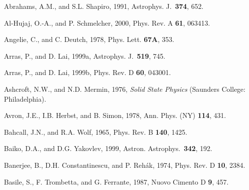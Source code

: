 


\begin{references}

\def\apj{{Astrophys. J.~}}
\def\aa{{Astron. Astrophys.~}}
\def\mnras{{Mon. Not. R. Astron. Soc.~}}
\def\pra{{Phys. Rev. A~}}
\def\prd{{Phys. Rev. D~}}
\def\prl{{Phys. Rev. Lett.~}}


\harvarditem{}{}{}
Abrahams, A.M., and S.L. Shapiro, 1991, \apj {\bf 374}, 652.


\harvarditem{}{}{}
Al-Hujaj, O.-A., and P. Schmelcher, 2000, Phys. Rev. A {\bf 61}, 063413.

\harvarditem{}{}{}
Angelie, C., and C. Deutch, 1978, Phys. Lett. {\bf 67A}, 353.

\harvarditem{}{}{}
Arras, P., and D. Lai, 1999a, \apj {\bf 519}, 745.

\harvarditem{}{}{}
Arras, P., and D. Lai, 1999b, Phys. Rev. D {\bf 60}, 043001.

\harvarditem{}{}{}
Ashcroft, N.W., and N.D. Mermin, 1976, {\it Solid State Physics} (Saunders
College: Philadelphia).

\harvarditem{}{}{}
Avron, J.E., I.B. Herbst, and B. Simon, 1978, 
Ann. Phys. (NY) {\bf 114}, 431.

\harvarditem{}{}{}
Bahcall, J.N., and R.A. Wolf, 1965, Phys. Rev. B {\bf 140}, 1425.

\harvarditem{}{}{}
Baiko, D.A., and D.G. Yakovlev, 1999, \aa {\bf 342}, 192. 

\harvarditem{}{}{}
Banerjee, B., D.H. Constantinescu, and P. Reh\'ak, 1974, 
Phys. Rev. D {\bf 10}, 2384.

\harvarditem{}{}{}
Basile, S., F. Trombetta, and G. Ferrante, 1987, 
Nuovo Cimento D {\bf 9}, 457.


\end{references}
